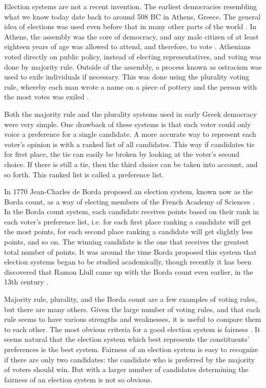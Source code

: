 Election systems are not a recent invention. The earliest democracies resembling what we know today date back to around 508 BC in Athens, Greece. The general idea of elections was used even before that in many other parts of the world \cite{democracybritannica}. In Athens, the assembly was the core of democracy, and any male citizen of at least eighteen years of age was allowed to attend, and therefore, to vote \cite{heinemann1952}. Athenians voted directly on public policy, instead of electing representatives, and voting was done by majority rule. Outside of the assembly, a process known as ostracism was used to exile individuals if necessary. This was done using the plurality voting rule, whereby each man wrote a name on a piece of pottery and the person with the most votes was exiled \cite{oturnbull}.

Both the majority rule and the plurality systems used in early Greek democracy were very simple. One drawback of these systems is that each voter could only voice a preference for a single candidate. A more accurate way to represent each voter's opinion is with a ranked list of all candidates. This way if candidates tie for first place, the tie can easily be broken by looking at the voter's second choice. If there is still a tie, then the third choice can be taken into account, and so forth. This ranked list is called a preference list.

In 1770 Jean-Charles de Borda proposed an election system, known now as the Borda count, as a way of electing members of the French Academy of Sciences \cite{borda1781mémoire}. In the Borda count system, each candidate receives points based on their rank in each voter's preference list, i.e. for each first place ranking a candidate will get the most points, for each second place ranking a candidate will get slightly less points, and so on. The winning candidate is the one that receives the greatest total number of points. It was around the time Borda proposed this system that election systems began to be studied academically, though recently it has been discovered that Ramon Llull came up with the Borda count even earlier, in the 13th century \cite{hägele2001llull}.

Majority rule, plurality, and the Borda count are a few examples of voting rules, but there are many others. Given the large number of voting rules, and that each rule seems to have various strengths and weaknesses, it is useful to compare them to each other. The most obvious criteria for a good election system is fairness \cite{chevaleyre2006issues}. It seems natural that the election system which best represents the constituents' preferences is the best system. Fairness of an election system is easy to recognize if there are only two candidates: the candidate who is preferred by the majority of voters should win. But with a larger number of candidates determining the fairness of an election system is not so obvious.

